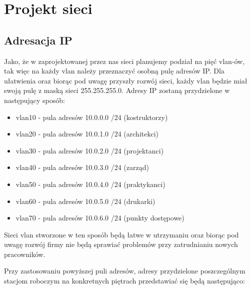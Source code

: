 \documentclass[a4paper, 12pt]{article}
\begin{document}
\section{Projekt sieci}

\subsection{Adresacja IP}
Jako, że w zaprojektowanej przez nas sieci planujemy podział na pięć vlan-ów, tak więc na każdy vlan należy przeznaczyć osobną pulę adresów IP. Dla ułatwienia oraz biorąc pod uwagę przyszły rozwój sieci, każdy vlan będzie miał swoją pulę z maską sieci 255.255.255.0. Adresy IP zostaną przydzielone w następujący sposób:

\begin{itemize}
\item vlan10 - pula adresów 10.0.0.0 /24 (kostruktorzy) 
\item vlan20 - pula adresów 10.0.1.0 /24 (architekci)
\item vlan30 - pula adresów 10.0.2.0 /24 (projektanci)
\item vlan40 - pula adresów 10.0.3.0 /24 (zarząd)
\item vlan50 - pula adresów 10.0.4.0 /24 (praktykanci)
\item vlan60 - pula adresów 10.0.5.0 /24 (drukarki)
\item vlan70 - pula adresów 10.0.6.0 /24 (punkty dostępowe)
\end{itemize}

Sieci vlan stworzone w ten sposób będą łatwe w utrzymaniu oraz biorąc pod uwagę rozwój firmy nie będą sprawiać problemów przy zatrudnianiu nowych pracowników.

Przy zastosowaniu powyższej puli adresów, adresy przydzielone poszczególnym stacjom roboczym na konkretnych piętrach przedstawiać się będą następująco:
\end{document}
